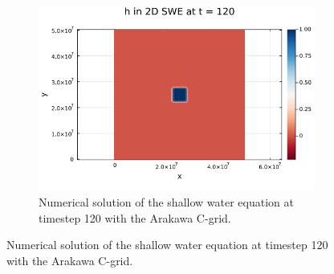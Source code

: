 \begin{figure}[h]
\begin{subfigure}[b]{0.3\textwidth}
        \includegraphics[width=\textwidth]{./images/swe2d-no-coriolis-120.png}
        \caption{Numerical solution of the shallow water equation at timestep 120 with the Arakawa C-grid.}
        \label{fig:nocoriolis120}
    \end{subfigure}
    \label{fig:2dswe}
\end{figure}